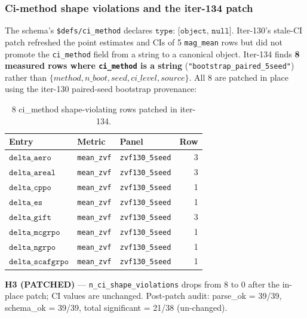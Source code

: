 \documentclass{article}
\begin{document}
\subsubsection{Ci-method shape violations and the iter-134 patch}
\label{sec:p6-iter134-ci-method-shape}

The schema's \texttt{\$defs/ci\_method} declares $\texttt{type: [object, null]}$.
Iter-130's stale-CI patch refreshed the point estimates and CIs of 5
\texttt{mag\_mean} rows but did not promote the \texttt{ci\_method} field
from a string to a canonical object. Iter-134 finds \textbf{8 measured rows
where \texttt{ci\_method} is a string} (\texttt{"bootstrap\_paired\_5seed"})
rather than $\{method, n\_boot, seed, ci\_level, source\}$. All 8 are
patched in place using the iter-130 paired-seed bootstrap provenance:

\begin{table}[h]
\centering
\small
\begin{tabular}{lllr}
\toprule
\textbf{Entry} & \textbf{Metric} & \textbf{Panel} & \textbf{Row} \\
\midrule
$\texttt{delta\_aero}$     & \texttt{mean\_zvf} & \texttt{zvf130\_5seed} & 3 \\
$\texttt{delta\_areal}$    & \texttt{mean\_zvf} & \texttt{zvf130\_5seed} & 3 \\
$\texttt{delta\_cppo}$     & \texttt{mean\_zvf} & \texttt{zvf130\_5seed} & 1 \\
$\texttt{delta\_es}$       & \texttt{mean\_zvf} & \texttt{zvf130\_5seed} & 1 \\
$\texttt{delta\_gift}$     & \texttt{mean\_zvf} & \texttt{zvf130\_5seed} & 3 \\
$\texttt{delta\_mcgrpo}$   & \texttt{mean\_zvf} & \texttt{zvf130\_5seed} & 1 \\
$\texttt{delta\_ngrpo}$    & \texttt{mean\_zvf} & \texttt{zvf130\_5seed} & 1 \\
$\texttt{delta\_scafgrpo}$ & \texttt{mean\_zvf} & \texttt{zvf130\_5seed} & 1 \\
\bottomrule
\end{tabular}
\caption{8 ci\_method shape-violating rows patched in iter-134.}
\label{tab:p6-iter134-ci-shape}
\end{table}

\textbf{H3 (PATCHED)} --- \texttt{n\_ci\_shape\_violations} drops from
8 to 0 after the in-place patch; CI values are unchanged. Post-patch
audit: parse\_ok = 39/39, schema\_ok = 39/39, total significant = 21/38
(un-changed).
\end{document}

